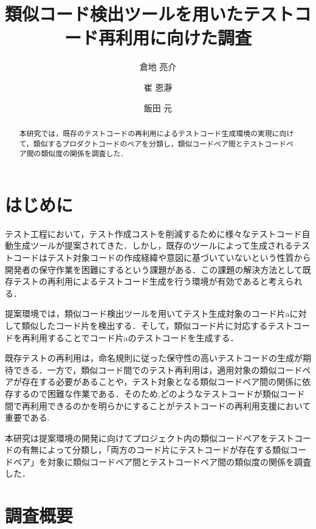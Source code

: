 \documentclass{fose2019}           %
\title{類似コード検出ツールを用いたテストコード再利用に向けた調査}
\author{倉地 亮介}{Ryosuke Kurachi, 奈良先端科学技術大学院大学}
\author{崔 恩瀞}{Eunjong Choi, 京都工芸繊維大学}
\author{飯田 元}{Hajimu Iida, 奈良先端科学技術大学院大学}
\begin{document}
\maketitle


\begin{abstract}
本研究では，既存のテストコードの再利用によるテストコード生成環境の実現に向けて，類似するプロダクトコードのペアを分類し，類似コードペア間とテストコードペア間の類似度の関係を調査した．
\end{abstract}

\section{はじめに}
テスト工程において，テスト作成コストを削減するために様々なテストコード自動生成ツールが提案されてきた．しかし，既存のツールによって生成されるテストコードはテスト対象コードの作成経緯や意図に基づいていないという性質から開発者の保守作業を困難にするという課題がある\cite{ICST}．この課題の解決方法として既存テストの再利用によるテストコード生成を行う環境が有効であると考えられる．

\indent 提案環境では，類似コード検出ツールを用いてテスト生成対象のコード片aに対して類似したコード片を検出する．そして，類似コード片に対応するテストコードを再利用することでコード片aのテストコードを生成する．

\indent 既存テストの再利用は，命名規則に従った保守性の高いテストコードの生成が期待できる．一方で，類似コード間でのテスト再利用は，適用対象の類似コードペアが存在する必要があることや，テスト対象となる類似コードペア間の関係に依存するので困難な作業である．そのため,どのようなテストコードが類似コード間で再利用できるのかを明らかにすることがテストコードの再利用支援において重要である.

\indent 本研究は提案環境の開発に向けてプロジェクト内の類似コードペアをテストコードの有無によって分類し，「両方のコード片にテストコードが存在する類似コードペア」を対象に類似コードペア間とテストコードペア間の類似度の関係を調査した．

\section{調査概要}
\end{document}
